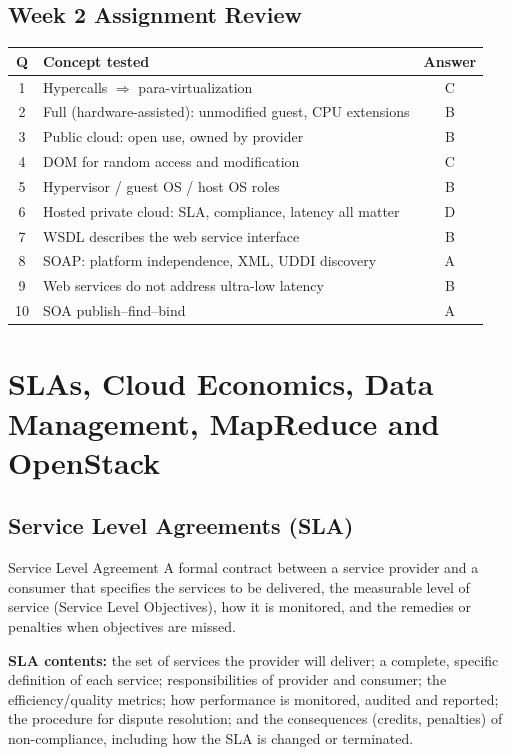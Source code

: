 \documentclass[11pt,a4paper,openany]{report}
\begin{document}
\section{Week 2 Assignment Review}
\begin{center}
\begin{tabularx}{\textwidth}{cXc}
\toprule
Q & Concept tested & Answer\\
\midrule
1 & Hypercalls $\Rightarrow$ para-virtualization & C\\
2 & Full (hardware-assisted): unmodified guest, CPU extensions & B\\
3 & Public cloud: open use, owned by provider & B\\
4 & DOM for random access and modification & C\\
5 & Hypervisor / guest OS / host OS roles & B\\
6 & Hosted private cloud: SLA, compliance, latency all matter & D\\
7 & WSDL describes the web service interface & B\\
8 & SOAP: platform independence, XML, UDDI discovery & A\\
9 & Web services do not address ultra-low latency & B\\
10 & SOA publish--find--bind & A\\
\bottomrule
\end{tabularx}
\end{center}

\chapter{SLAs, Cloud Economics, Data Management, MapReduce and OpenStack}

\section{Service Level Agreements (SLA)}
\begin{defbox}{Service Level Agreement}
A formal contract between a service provider and a consumer that specifies the services to be delivered,
the measurable level of service (Service Level Objectives), how it is monitored, and the remedies or penalties
when objectives are missed.
\end{defbox}

\textbf{SLA contents:} the set of services the provider will deliver; a complete, specific definition of each
service; responsibilities of provider and consumer; the efficiency/quality metrics; how performance is monitored,
audited and reported; the procedure for dispute resolution; and the consequences (credits, penalties) of
non-compliance, including how the SLA is changed or terminated.
\end{document}
